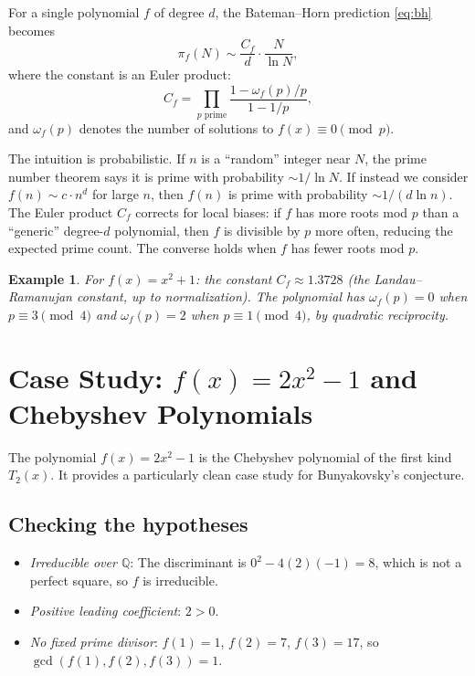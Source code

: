 \documentclass[11pt,a4paper]{article}
\newtheorem{example}[theorem]{Example}
\newcommand{\Q}{\mathbb{Q}}
\begin{document}
For a single polynomial $f$ of degree $d$, the Bateman--Horn prediction \eqref{eq:bh} becomes
\[
    \pi_f(N) \sim \frac{C_f}{d} \cdot \frac{N}{\ln N},
\]
where the constant is an Euler product:
\begin{equation}\label{eq:constant}
    C_f = \prod_{p \text{ prime}} \frac{1 - \omega_f(p)/p}{1 - 1/p},
\end{equation}
and $\omega_f(p)$ denotes the number of solutions to $f(x) \equiv 0 \pmod{p}$.

The intuition is probabilistic. If $n$ is a ``random'' integer near $N$, the prime number theorem says it is prime with probability $\sim 1/\ln N$. If instead we consider $f(n) \sim c \cdot n^d$ for large $n$, then $f(n)$ is prime with probability $\sim 1/(d \ln n)$. The Euler product $C_f$ corrects for local biases: if $f$ has more roots mod $p$ than a ``generic'' degree-$d$ polynomial, then $f$ is divisible by $p$ more often, reducing the expected prime count. The converse holds when $f$ has fewer roots mod $p$.

\begin{example}
For $f(x) = x^2 + 1$: the constant $C_f \approx 1.3728$ (the Landau--Ramanujan constant, up to normalization). The polynomial has $\omega_f(p) = 0$ when $p \equiv 3 \pmod{4}$ and $\omega_f(p) = 2$ when $p \equiv 1 \pmod{4}$, by quadratic reciprocity.
\end{example}

\section{Case Study: $f(x) = 2x^2 - 1$ and Chebyshev Polynomials}

The polynomial $f(x) = 2x^2 - 1$ is the Chebyshev polynomial of the first kind $T_2(x)$. It provides a particularly clean case study for Bunyakovsky's conjecture.

\subsection{Checking the hypotheses}

\begin{itemize}
    \item \emph{Irreducible over $\Q$}: The discriminant is $0^2 - 4(2)(-1) = 8$, which is not a perfect square, so $f$ is irreducible.
    \item \emph{Positive leading coefficient}: $2 > 0$.
    \item \emph{No fixed prime divisor}: $f(1) = 1$, $f(2) = 7$, $f(3) = 17$, so $\gcd(f(1), f(2), f(3)) = 1$.
\end{itemize}
\end{document}
